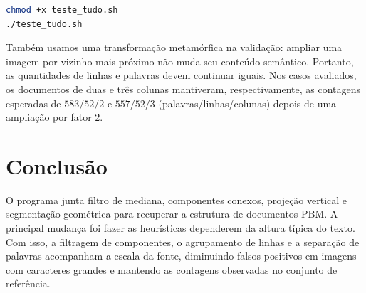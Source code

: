 \documentclass[12pt,a4paper]{article}
\begin{document}
\begin{lstlisting}[language=bash]
chmod +x teste_tudo.sh
./teste_tudo.sh
\end{lstlisting}

Também usamos uma transformação metamórfica na validação: ampliar uma imagem por vizinho mais próximo não muda seu conteúdo semântico. Portanto, as quantidades de linhas e palavras devem continuar iguais. Nos casos avaliados, os documentos de duas e três colunas mantiveram, respectivamente, as contagens esperadas de $583/52/2$ e $557/52/3$ (palavras/linhas/colunas) depois de uma ampliação por fator $2$.

\section{Conclusão}

O programa junta filtro de mediana, componentes conexos, projeção vertical e segmentação geométrica para recuperar a estrutura de documentos PBM. A principal mudança foi fazer as heurísticas dependerem da altura típica do texto. Com isso, a filtragem de componentes, o agrupamento de linhas e a separação de palavras acompanham a escala da fonte, diminuindo falsos positivos em imagens com caracteres grandes e mantendo as contagens observadas no conjunto de referência.
\end{document}
